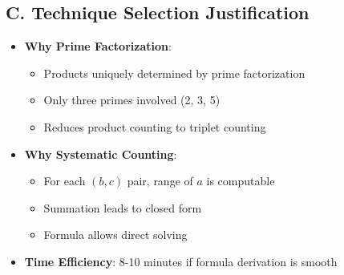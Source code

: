 \documentclass[12pt]{article}
\begin{document}
\begin{techniquesbox}
\subsection*{C. Technique Selection Justification}
\begin{itemize}[leftmargin=*]
    \item \textbf{Why Prime Factorization}: 
    \begin{itemize}
        \item Products uniquely determined by prime factorization
        \item Only three primes involved (2, 3, 5)
        \item Reduces product counting to triplet counting
    \end{itemize}
    \item \textbf{Why Systematic Counting}: 
    \begin{itemize}
        \item For each $(b,c)$ pair, range of $a$ is computable
        \item Summation leads to closed form
        \item Formula allows direct solving
    \end{itemize}
    \item \textbf{Time Efficiency}: 8-10 minutes if formula derivation is smooth
\end{itemize}
\end{techniquesbox}
\end{document}
